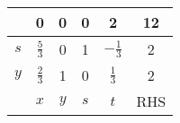 \begin{tabular}[12pt]{ |c|c|c|c|c|c|}
    \hline
     & 0 & 0 & 0 & 2 & 12 \\
    \hline
    $s$ & $\frac{5}{3}$ & 0 & 1 & $-\frac{1}{3}$ & 2\\
    \hline 
    $y$ & $\frac{2}{3}$ & 1 & 0 & $\frac{1}{3}$ & 2\\
    \hline
     & $x$ & $y$ & $s$ & $t$ &RHS\\
    \hline
    \end{tabular}
